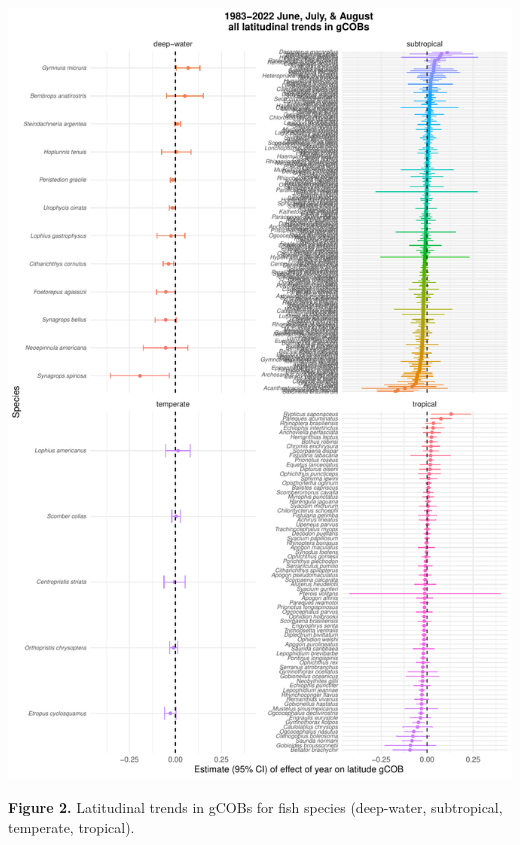 \documentclass[
  letterpaper,
  DIV=11,
  numbers=noendperiod]{scrartcl}
\begin{document}
\includegraphics{9_westernGoM_summer_files/figure-pdf/Fig_2-1.pdf}

\textbf{Figure 2.} Latitudinal trends in gCOBs for fish species
(deep-water, subtropical, temperate, tropical).
\end{document}
